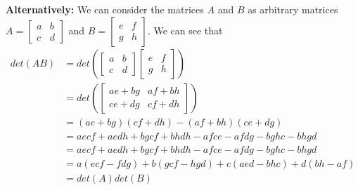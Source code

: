 \documentclass[answers,12pt,addpoints]{exam}
\begin{document}
\begin{questions}
\begin{solution}
        \textbf{Alternatively:}
        We can consider the matrices $A$ and $B$ as arbitrary matrices $A = \begin{bmatrix}
            a & b \\ c & d
        \end{bmatrix}$ and $B = \begin{bmatrix}
            e & f \\ g & h
        \end{bmatrix}$. We can see that
        \begin{align*}
            det(AB) &= det\left(\begin{bmatrix}
                a & b \\ c & d
            \end{bmatrix} \begin{bmatrix}
                e & f \\ g & h
            \end{bmatrix}\right)\\
            &= det\left(\begin{bmatrix}
                ae + bg & af + bh \\ ce + dg & cf + dh
            \end{bmatrix}\right)\\
            &= (ae + bg)(cf + dh) - (af + bh)(ce + dg)\\
            &= aecf + aedh + bgcf + bhdh - afce - afdg - bghc - bhgd\\
            &= aecf + aedh + bgcf + bhdh - afce - afdg - bghc - bhgd\\
            &= a(ecf - fdg) + b(gcf - hgd) + c(aed - bhc) + d(bh - af)\\
            &= det(A)det(B)
        \end{align*}


\end{solution}
\end{questions}
\end{document}
